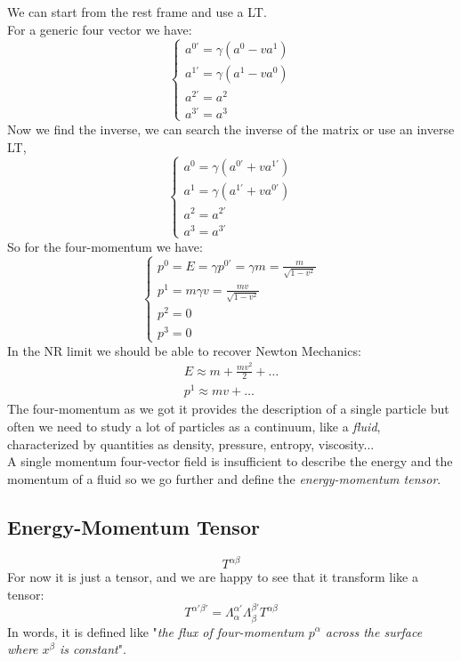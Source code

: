 We can start from the rest frame and use a LT. \\
For a generic four vector we have:
\begin{equation}
\begin{cases}
a^{0'} = \gamma \left( a^{0}- va^{1} \right) \\
a^{1'} = \gamma \left( a^{1}-va^{0} \right)\\
 a^{2'} = a^{2} \\
 a^{3'} = a^{3}
\end{cases}
\end{equation}
Now we find the inverse, we can search the inverse of the matrix or use an inverse LT,
\begin{equation}
\begin{cases}
a^{0} = \gamma \left( a^{0'}+va^{1'} \right) \\
a^{1} = \gamma \left( a^{1'}+va^{0'} \right) \\
a^{2} = a^{2'} \\
a^{3} = a^{3'}
\end{cases}
\end{equation}
So for the four-momentum we have:
\begin{equation}
\begin{cases}
	p^{0} = E = \gamma p^{0'} = \gamma m = \frac{m}{\sqrt{1-v^{2}}} \\
	p^{1} = m \gamma v = \frac{mv}{\sqrt{1-v^{2}}} \\
	p^{2} = 0 \\
	p^{3 }= 0
\end{cases}
\end{equation}
In the NR limit we should be able to recover Newton Mechanics:
\begin{gather*}
E  \approx m + \frac{mv^{2}}{2} + \ldots  \\
p^{1} \approx mv + \ldots 
\end{gather*}
The four-momentum as we got it provides the description of a single particle but often we need to study a lot of particles as a continuum, like a \emph{fluid}, characterized by quantities as density, pressure, entropy, viscosity... \\
A single momentum four-vector field is insufficient to describe the energy and the momentum of a fluid so we go further and define the \emph{energy-momentum tensor}.
\subsection{Energy-Momentum Tensor}
\[
T^{\alpha \beta }
\]
For now it is just a tensor, and we are happy to see that it transform like a tensor:
\[
T^{\alpha ' \beta '} = \Lambda^{\alpha '}_{\alpha }\Lambda^{\beta '}_{\beta }T^{\alpha \beta }
\]
In words, it is defined like "\emph{the flux of four-momentum $p^{\alpha }$ across the surface where $x^{\beta }$ is constant}".

